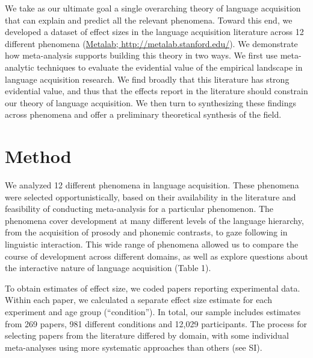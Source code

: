 \documentclass[english,floatsintext,man]{apa6}
\begin{document}
We take as our ultimate goal a single overarching theory of language
acquisition that can explain and predict all the relevant phenomena.
Toward this end, we developed a dataset of effect sizes in the language
acquisition literature across 12 different phenomena
(\href{http://metalab.stanford.edu}{Metalab;
http://metalab.stanford.edu/}). We demonstrate how meta-analysis
supports building this theory in two ways. We first use meta-analytic
techniques to evaluate the evidential value of the empirical landscape
in language acquisition research. We find broadly that this literature
has strong evidential value, and thus that the effects report in the
literature should constrain our theory of language acquisition. We then
turn to synthesizing these findings across phenomena and offer a
preliminary theoretical synthesis of the field.

\section{Method}\label{method}

We analyzed 12 different phenomena in language acquisition. These
phenomena were selected opportunistically, based on their availability
in the literature and feasibility of conducting meta-analysis for a
particular phenomenon. The phenomena cover development at many different
levels of the language hierarchy, from the acquisition of prosody and
phonemic contrasts, to gaze following in linguistic interaction. This
wide range of phenomena allowed us to compare the course of development
across different domains, as well as explore questions about the
interactive nature of language acquisition (Table 1).

To obtain estimates of effect size, we coded papers reporting
experimental data. Within each paper, we calculated a separate effect
size estimate for each experiment and age group (\enquote{condition}).
In total, our sample includes estimates from 269 papers, 981 different
conditions and 12,029 participants. The process for selecting papers
from the literature differed by domain, with some individual
meta-analyses using more systematic approaches than others (see SI).
\renewcommand{\arraystretch}{1.5}
\end{document}
